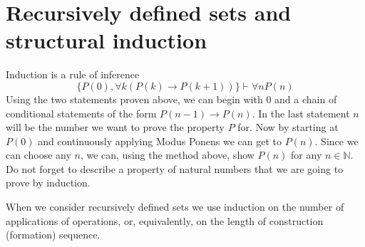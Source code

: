 \documentclass[letterpaper, 10pt]{article}
\theoremstyle{definition}
\theoremstyle{definition}
\newcommand{\set}[1]{\{#1\}}
\renewcommand{\implies}{\rightarrow}
\newcommand{\entails}{\vdash}
\begin{document}
\section{Recursively defined sets and structural induction}

Induction is a rule of inference
\[
	\set{P(0), \forall k (P(k) \implies P(k+1))} \entails \forall n P(n)
\]
Using the two statements proven above, we can begin with $0$ and a chain of
conditional statements of the form $P(n-1) \implies P(n)$. In the last statement
$n$ will be the number we want to prove the property $P$ for. Now by starting at
$P(0)$ and continuously applying Modus Ponens we can get to $P(n)$. Since we can
choose any $n$, we can, using the method above, show $P(n)$ for any $n \in
\mathbb{N}$.
Do not forget to describe a property of natural numbers that we are going to
prove by induction.

When we consider recursively defined sets we use induction on the number of
applications of operations, or, equivalently, on the length of construction
(formation) sequence.
\end{document}
